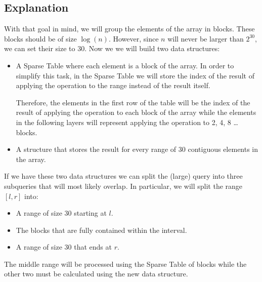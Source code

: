 \subsection*{Explanation}
With that goal in mind, we will group the elements of the array in blocks.
These blocks should be of size $\log (n)$. However, since $n$ will never
be larger than $2^{30}$, we can set their size to 30. Now we we will build 
two data structures:
\begin{itemize}
		\setlength{\itemsep}{2pt}
		\item A Sparse Table where each element is a block of the array. 
				In order to simplify this task, in the Sparse Table we will
				store the index of the result of applying the operation to the 
				range instead of the result itself. 

				Therefore, the elements in the first row of the table will be the 
				index of the result of applying the operation to each block of the array while
				the elements in the following layers will represent applying the
				operation to 2, 4, 8 \dots blocks.

		\item A structure that stores the result for every range of 30 contiguous 
				elements in the array.
\end{itemize}

If we have these two data structures we can split the (large) query into three subqueries
that will most likely overlap. In particular, we will split the range $[l, r]$ into:
\begin{itemize}
		\setlength{\itemsep}{0pt}
		\item A range of size 30 starting at $l$.
		\item The blocks that are fully contained within the interval.
		\item A range of size 30 that ends at $r$.
\end{itemize}
The middle range will be processed using the Sparse Table of blocks while the other 
two must be calculated using the new data structure.

